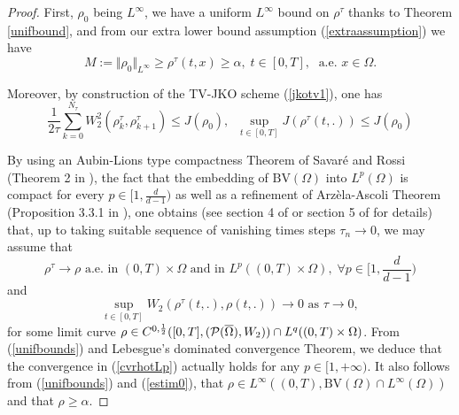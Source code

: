 \documentclass[12pt, a4paper]{article}
\numberwithin{equation}{section}
\theoremstyle{plain}
\theoremstyle{definition}
\theoremstyle{remark}
\newcommand\PP{{\cal P}}
\newcommand{\BV}{\mathrm{BV}}
\newcommand{\Omb}{\overline{\Omega}}
\newcommand\pref[1]{(\ref{#1})}
\begin{document}
\begin{proof}
First, $\rho_0$ being $L^\infty$, we have a uniform $L^\infty$ bound on $\rho^\tau$ thanks to Theorem \ref{unifbound}, and from our extra lower bound assumption \pref{extraassumption} we have
\begin{equation}\label{unifbounds}
M:=\Vert \rho_0\Vert_{L^{\infty}} \ge    \rho^\tau(t,x) \ge \alpha, \; t\in [0,T], \; \mbox{ a.e. } x\in \Omega.
 \end{equation}

Moreover, by construction of the TV-JKO scheme \pref{jkotv1}, one has
\begin{equation}\label{estim0}
\frac{1}{2\tau} \sum_{k=0}^{N_\tau}  W_2^2(\rho_k^\tau, \rho_{k+1}^\tau) \le J(\rho_0), \;   \;  \sup_{t\in [0,T]} J(\rho^\tau(t,.)) \le J(\rho_0)
\end{equation}

 By using an Aubin-Lions type compactness Theorem of Savar\'e and Rossi (Theorem 2 in \cite{rossi2003tightness}), the fact that the embedding of $\BV(\Omega)$ into $L^p(\Omega)$ is compact for every $p\in [1, \frac{d}{d-1})$ as well as a refinement of Arz\`ela-Ascoli Theorem (Proposition 3.3.1 in \cite{ambrosio2008gradient}), one obtains (see  section 4 of \cite{DiF2014curves}  or section 5 of \cite{carlier2017split} for details) that, up to taking suitable sequence of vanishing times steps  $\tau_n\to 0$, we may assume that 
 \begin{equation}\label{cvrhotLp}
 \rho^\tau \to \rho \mbox{ a.e.  in $(0,T)\times \Omega$  and in } L^p((0,T)\times \Omega), \; \forall p\in [1, \frac{d}{d-1})
 \end{equation} 
 and 
 \begin{equation}\label{cvunifw}
\sup_{t\in [0,T]}  W_2(\rho^\tau(t,.), \rho(t, .)) \to 0 \mbox{ as } \tau \to 0, 
 \end{equation}
 for some limit curve $\rho \in C^{0,\frac{1}{2}} ([0,T], (\PP(\Omb), W_2)) \cap L^q((0,T)\times \Omega)$. From \pref{unifbounds} and Lebesgue's dominated convergence Theorem, we deduce that the convergence in \pref{cvrhotLp} actually holds for any $p\in [1, +\infty)$. It also follows from \pref{unifbounds} and \pref{estim0}, that $\rho \in L^{\infty}((0,T), \BV(\Omega)\cap L^{\infty}(\Omega))$ and that $\rho \ge \alpha$. 
 
  \smallskip
  

\end{proof}
\end{document}
